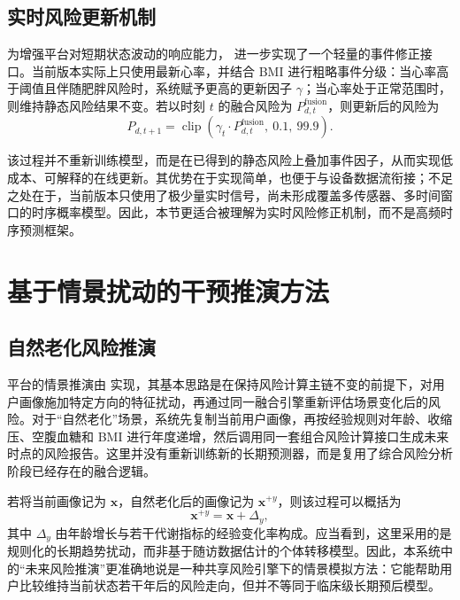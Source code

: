 \subsection{实时风险更新机制}

为增强平台对短期状态波动的响应能力， 进一步实现了一个轻量的事件修正接口。当前版本实际上只使用最新心率，并结合 BMI 进行粗略事件分级：当心率高于阈值且伴随肥胖风险时，系统赋予更高的更新因子 \(\gamma\)；当心率处于正常范围时，则维持静态风险结果不变。若以时刻 \(t\) 的融合风险为 \(P_{d,t}^{\text{fusion}}\)，则更新后的风险为
\begin{equation}
P_{d,t+1} = \operatorname{clip}\!\left(\gamma_t \cdot P_{d,t}^{\text{fusion}},\ 0.1,\ 99.9 \right).
\end{equation}

该过程并不重新训练模型，而是在已得到的静态风险上叠加事件因子，从而实现低成本、可解释的在线更新。其优势在于实现简单，也便于与设备数据流衔接；不足之处在于，当前版本只使用了极少量实时信号，尚未形成覆盖多传感器、多时间窗口的时序概率模型。因此，本节更适合被理解为实时风险修正机制，而不是高频时序预测框架。

\section{基于情景扰动的干预推演方法}

\subsection{自然老化风险推演}

平台的情景推演由  实现，其基本思路是在保持风险计算主链不变的前提下，对用户画像施加特定方向的特征扰动，再通过同一融合引擎重新评估场景变化后的风险。对于“自然老化”场景，系统先复制当前用户画像，再按经验规则对年龄、收缩压、空腹血糖和 BMI 进行年度递增，然后调用同一套组合风险计算接口生成未来时点的风险报告。这里并没有重新训练新的长期预测器，而是复用了综合风险分析阶段已经存在的融合逻辑。

若将当前画像记为 \(\mathbf{x}\)，自然老化后的画像记为 \(\mathbf{x}^{+y}\)，则该过程可以概括为
\begin{equation}
\mathbf{x}^{+y} = \mathbf{x} + \Delta_y,
\end{equation}
其中 \(\Delta_y\) 由年龄增长与若干代谢指标的经验变化率构成。应当看到，这里采用的是规则化的长期趋势扰动，而非基于随访数据估计的个体转移模型。因此，本系统中的“未来风险推演”更准确地说是一种共享风险引擎下的情景模拟方法：它能帮助用户比较维持当前状态若干年后的风险走向，但并不等同于临床级长期预后模型。

